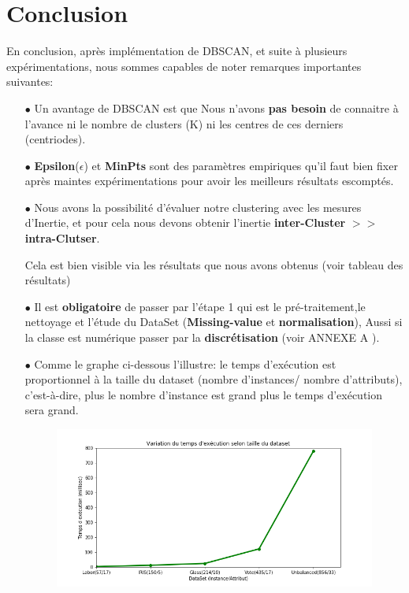 \documentclass[12pt,a4paper,oneside]{book}
\begin{document}
\newpage 

\section{Conclusion}
En conclusion, après implémentation de DBSCAN, et suite à plusieurs expérimentations, nous sommes capables de noter remarques importantes suivantes:\\
\begin{itemize}
	\item[$\bullet$] Un avantage de DBSCAN est que Nous n'avons \textbf{pas besoin} de connaitre à l'avance ni le nombre de clusters (K) ni les centres de ces derniers (centriodes).
	
	\item[$\bullet$] \textbf{Epsilon}($\epsilon$) et \textbf{MinPts} sont des paramètres empiriques qu'il faut bien fixer après maintes expérimentations pour avoir les meilleurs résultats escomptés.
	
	\item[$\bullet$] Nous avons la possibilité d'évaluer notre clustering avec les mesures d'Inertie, et pour cela nous devons obtenir l'inertie \textbf{inter-Cluster} $>>$ \textbf{intra-Clutser}.
	
	Cela est bien visible via les résultats que nous avons obtenus (voir tableau des résultats)
	
	\item[$\bullet$] Il est \textbf{obligatoire} de passer par l'étape 1 qui est le pré-traitement,le nettoyage et l'étude du DataSet (\textbf{Missing-value} et \textbf{normalisation}),
	Aussi si la classe est numérique passer par la \textbf{discrétisation} (voir ANNEXE A ).
	
	\item[$\bullet$] Comme le graphe ci-dessous l'illustre: le temps d'exécution est proportionnel à la taille du dataset (nombre d'instances/ nombre d'attributs), c'est-à-dire, plus le nombre d'instance est grand plus le temps d'exécution sera grand.
	
	\begin{figure}[H]
		\centering
		\includegraphics[scale=0.6]{image/dbscanPlot.png}
		\label{labelname}%
	\end{figure}
	

\end{itemize}
\end{document}
